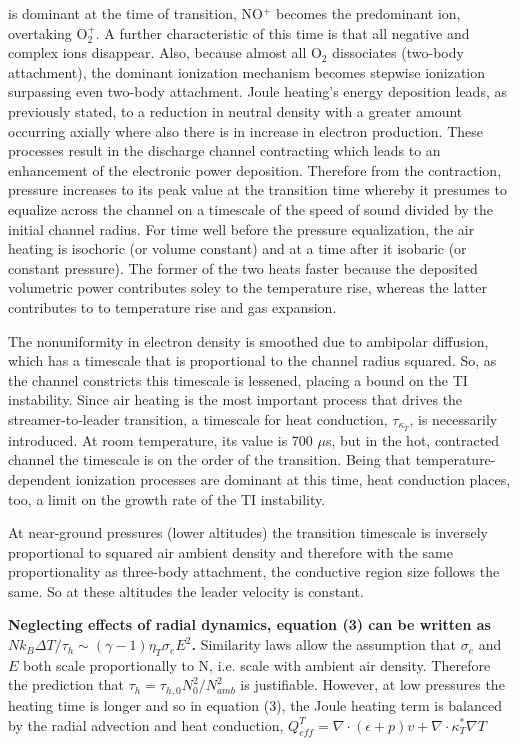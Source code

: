 \documentclass[]{article}
\begin{document}
	\begin{center}
	\end{center}
	is dominant at the time of transition, NO$^+$ becomes the predominant ion, overtaking O$_2^+$. A further characteristic of this time is that all negative and complex ions disappear. Also, because almost all O$_2$ dissociates (two-body attachment), the dominant ionization mechanism becomes stepwise ionization surpassing even two-body attachment. Joule heating's energy deposition leads, as previously stated, to a reduction in neutral density with a greater amount occurring axially where also there is in increase in electron production. These processes result in the discharge channel contracting which leads to an enhancement of the electronic power deposition. Therefore from the contraction, pressure increases to its peak value at the transition time whereby it presumes to equalize across the channel on a timescale of the speed of sound divided by the initial channel radius. For time well before the pressure equalization, the air heating is isochoric (or volume constant) and at a time after it isobaric (or constant pressure). The former of the two heats faster because the deposited volumetric power contributes soley to the temperature rise, whereas the latter contributes to to temperature rise and gas expansion. 
	
	The nonuniformity in electron density is smoothed due to ambipolar diffusion, which has a timescale that is proportional to the channel radius squared. So, as the channel constricts this timescale is lessened, placing a bound on the TI instability. Since air heating is the most important process that drives the streamer-to-leader transition, a timescale for heat conduction, $\tau_{\kappa_T}$, is necessarily introduced. At room temperature, its value is 700 $\mu$s, but in the hot, contracted channel the timescale is on the order of the transition. Being that temperature-dependent ionization processes are dominant at this time, heat conduction places, too, a limit on the growth rate of the TI instability. 
	
	At near-ground pressures (lower altitudes) the transition timescale is inversely proportional to squared air ambient density and therefore with the same proportionality as three-body attachment, the conductive region size follows the same. So at these altitudes the leader velocity is constant.
	
	\textbf{Neglecting effects of radial dynamics, equation (3) can be written as $Nk_B\Delta T / \tau_h \sim (\gamma - 1)\eta_T\sigma_eE^2$.} Similarity laws allow the assumption that $\sigma_e$ and $E$ both scale proportionally to N, i.e. scale with ambient air density. Therefore the prediction that $\tau_h = \tau_{h,0} N_0^2/N_{amb}^2$ is justifiable. However, at low pressures the heating time is longer and so in equation (3), the Joule heating term is balanced by the radial advection and heat conduction, $Q_{eff}^T = \nabla \cdot {(\epsilon + p) {v}} + \nabla \cdot {\kappa_T^* \nabla T} $
	
\end{document}
